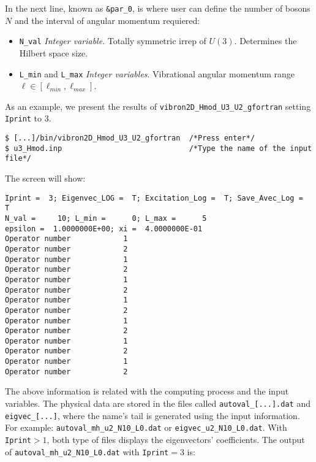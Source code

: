 \documentclass[a4paper,12pt,captions=tableheading]{article}
\begin{document}
In the next line, known as \texttt{\&par\_0}, is where user can define the number of bosons \(N\) and the interval of angular momentum requiered:

\begin{itemize}
\item \verb~N_val~ \emph{Integer variable}. Totally symmetric irrep of \( U(3) \). Determines the Hilbert space size.
\item \verb~L_min~ and \verb~L_max~ \emph{Integer variables}. Vibrational angular momentum range \(\ell\in[\ell_{min},\ell_{max}]\).
\end{itemize}

As an example, we present the results of \texttt{vibron2D\_Hmod\_U3\_U2\_gfortran} setting \verb~Iprint~ to 3.

\begin{verbatim}
$ [...]/bin/vibron2D_Hmod_U3_U2_gfortran  /*Press enter*/
$ u3_Hmod.inp                             /*Type the name of the input file*/
\end{verbatim}

The screen will show:

\begin{verbatim}
Iprint =  3; Eigenvec_LOG =  T; Excitation_Log =  T; Save_Avec_Log =  T
N_val =     10; L_min =      0; L_max =      5
epsilon =  1.0000000E+00; xi =  4.0000000E-01
Operator number            1
Operator number            2
Operator number            1
Operator number            2
Operator number            1
Operator number            2
Operator number            1
Operator number            2
Operator number            1
Operator number            2
Operator number            1
Operator number            2
Operator number            1
Operator number            2
\end{verbatim}

The above information is related with the computing process and the input variables. The physical data are stored in the files called \texttt{autoval\_[...].dat} and \texttt{eigvec\_[...]}, where the name's tail is generated using the input information. For example: \texttt{autoval\_mh\_u2\_N10\_L0.dat} or \texttt{eigvec\_u2\_N10\_L0.dat}. With \verb~Iprint~\(>1\), both type of files displays the eigenvectors' coefficients. The output of \texttt{autoval\_mh\_u2\_N10\_L0.dat} with \verb~Iprint~\(=3\) is:
\end{document}
